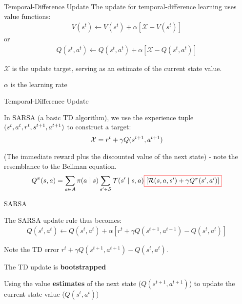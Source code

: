 \begin{frame}{Temporal-Difference Update}
    The update for temporal-difference learning uses value functions:
    \vspace{0pt}
    \begin{align*}
        V(s^{t}) \gets V(s^{t}) + \alpha \left[\mathcal{X} - V(s^{t})\right]
    \end{align*}
    or 
    \vspace{0pt}
    \begin{align*}
        Q(s^{t}, a^{t}) \gets Q(s^{t}, a^{t})  + \alpha \left[\mathcal{X} - Q(s^{t}, a^{t})\right]
    \end{align*}
	\blist
    	\item $\mathcal{X}$ is the update target, serving as an estimate of the current state value. 
    	\item $\alpha$ is the learning rate
    \elist
\end{frame}

\begin{frame}{Temporal-Difference Update}
    
    In SARSA (a basic TD algorithm), we use the experience tuple $(s^{t}, a^{t}, r^{t}, s^{t+1}, a^{t+1})$ to construct a target:
    \begin{align*}
        \mathcal{X} = r^t + \gamma Q(s^{t+1}, a^{t+1})
    \end{align*}
    
    (The immediate reward plus the discounted value of the next state) - note the resemblance to the Bellman equation. 
    \vspace{10pt}
    \begin{align*}
        Q^{\pi}(\st, \ac) = \sum_{\ac \in \Ac} \pi(\ac \mid \st) \sum_{\st' \in \St} \Stf(\st' \mid \st, \ac) \Cboxed{red}{$\left[\Rew(\st, \ac, \st') + \gamma Q^{\pi}(s', a')\right]$}
    \end{align*}
\end{frame}

\begin{frame}{SARSA}
    
The SARSA update rule thus becomes:
\vspace{0pt}
\begin{align*}
  Q(s^t, a^t) \leftarrow Q(s^t, a^t) + \alpha[r^t + \gamma Q(s^{t+1}, a^{t+1})- Q(s^t,a^t)] 
\end{align*}

\blist
    \item Note the TD error $r^t + \gamma Q(s^{t+1}, a^{t+1})- Q(s^t,a^t)$.
    \item The TD update is \textbf{bootstrapped}
    \item Using the value \textbf{estimates} of the next state ($Q(s^{t+1}, a^{t+1})$) to update the current state value ($Q(s^t,a^t)$)
\elist



\end{frame}

